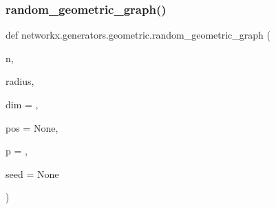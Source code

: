 \subsubsection{\texorpdfstring{random\+\_\+geometric\+\_\+graph()}{random\_geometric\_graph()}}
{\footnotesize\ttfamily def networkx.\+generators.\+geometric.\+random\+\_\+geometric\+\_\+graph (\begin{DoxyParamCaption}\item[{}]{n,  }\item[{}]{radius,  }\item[{}]{dim = {},  }\item[{}]{pos = {\ttfamily None},  }\item[{}]{p = {},  }\item[{}]{seed = {\ttfamily None} }\end{DoxyParamCaption})}

